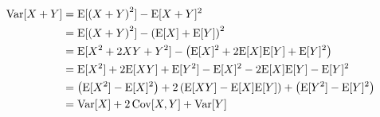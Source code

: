 \begin{align*}
\mathrm{Var}[X+Y] &= \mathrm{E}[\left(X+Y\right)^2] - \mathrm{E}[X+Y]^2 \\
          &= \mathrm{E}[\left(X+Y\right)^2] - \left(\mathrm{E}[X] + \mathrm{E}[Y]\right)^2 \\
          &= \mathrm{E}[X^2 + 2XY + Y^2] - \left(\mathrm{E}[X]^2 + 2 \mathrm{E}[X] \mathrm{E}[Y] + \mathrm{E}[Y]^2\right) \\
	  &= \mathrm{E}[X^2] + 2 \mathrm{E}[XY] + \mathrm{E}[Y^2] - \mathrm{E}[X]^2 - 2 \mathrm{E}[X] \mathrm{E}[Y] - \mathrm{E}[Y]^2 \\
	  &= \left(\mathrm{E}[X^2] - \mathrm{E}[X]^2\right) + 2 \left(\mathrm{E}[XY] - \mathrm{E}[X] \mathrm{E}[Y]\right) + \left(\mathrm{E}[Y^2] - \mathrm{E}[Y]^2\right) \\
	  &= \mathrm{Var}[X] + 2 \, \mathrm{Cov}[X,Y] + \mathrm{Var}[Y]
\end{align*}


